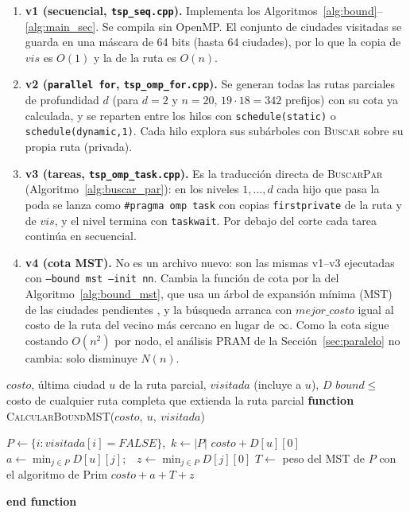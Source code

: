 \documentclass[12pt,a4paper]{article}
\makeatletter
\newcommand{\FUNCTION}[2]{\STATE \textbf{function} \textsc{#1}(#2)\begin{ALC@g}}
\newcommand{\ENDFUNCTION}{\end{ALC@g}\STATE \textbf{end function}}
\makeatother
\begin{document}
\begin{enumerate}
    \item \textbf{v1 (secuencial, \texttt{tsp\_seq.cpp}).} Implementa los Algoritmos~\ref{alg:bound}--\ref{alg:main_sec}. Se compila sin OpenMP. El conjunto de ciudades visitadas se guarda en una máscara de 64 bits (hasta 64 ciudades), por lo que la copia de $vis$ es $O(1)$ y la de la ruta es $O(n)$.
    \item \textbf{v2 (\texttt{parallel for}, \texttt{tsp\_omp\_for.cpp}).} Se generan todas las rutas parciales de profundidad $d$ (para $d=2$ y $n=20$, $19 \cdot 18 = 342$ prefijos) con su cota ya calculada, y se reparten entre los hilos con \texttt{schedule(static)} o \texttt{schedule(dynamic,1)}. Cada hilo explora sus subárboles con \textsc{Buscar} sobre su propia ruta (privada).
    \item \textbf{v3 (tareas, \texttt{tsp\_omp\_task.cpp}).} Es la traducción directa de \textsc{BuscarPar} (Algoritmo~\ref{alg:buscar_par}): en los niveles $1,\dots,d$ cada hijo que pasa la poda se lanza como \texttt{\#pragma omp task} con copias \texttt{firstprivate} de la ruta y de $vis$, y el nivel termina con \texttt{taskwait}. Por debajo del corte cada tarea continúa en secuencial.
    \item \textbf{v4 (cota MST).} No es un archivo nuevo: son las mismas v1--v3 ejecutadas con \texttt{--bound mst --init nn}. Cambia la función de cota por la del Algoritmo~\ref{alg:bound_mst}, que usa un árbol de expansión mínima (MST) de las ciudades pendientes \citep{prim1957shortest}, y la búsqueda arranca con $mejor\_costo$ igual al costo de la ruta del vecino más cercano en lugar de $\infty$. Como la cota sigue costando $O(n^2)$ por nodo, el análisis PRAM de la Sección~\ref{sec:paralelo} no cambia: solo disminuye $N(n)$.
\end{enumerate}

\begin{algorithm}[H]
\caption{\textsc{CalcularBoundMST}: cota inferior por árbol de expansión mínima (v4)}
\label{alg:bound_mst}
\begin{algorithmic}[1]
    \REQUIRE $costo$, última ciudad $u$ de la ruta parcial, $visitada$ (incluye a $u$), $D$
    \ENSURE $bound \le$ costo de cualquier ruta completa que extienda la ruta parcial
    \FUNCTION{CalcularBoundMST}{$costo,\ u,\ visitada$}
        \STATE $P \gets \{i : visitada[i] = FALSE\}$,\ $k \gets |P|$ 
            \RETURN $costo + D[u][0]$
        \ENDIF
        \STATE $a \gets \min_{j \in P} D[u][j]$;\ \ $z \gets \min_{j \in P} D[j][0]$ 
        \STATE $T \gets$ peso del MST de $P$ con el algoritmo de Prim 
        \RETURN $costo + a + T + z$ 
    \ENDFUNCTION
\end{algorithmic}
\end{algorithm}
\end{document}
